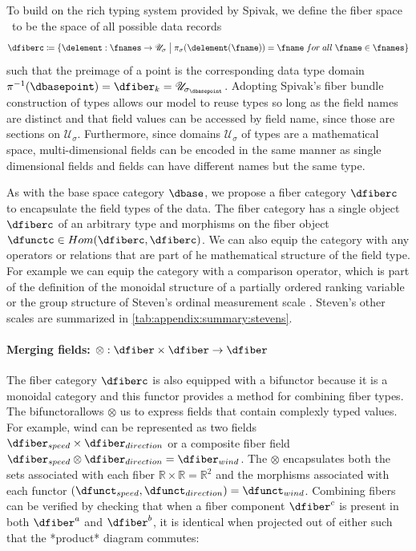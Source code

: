 \documentclass[journal]{IEEEtran}
\theoremstyle{definition}
\theoremstyle{remark}
\begin{document}
To build on the rich typing system provided by Spivak, we define the \textcolor{fiber}{fiber space} \dfiberc\ to be the space of all possible data records
\begin{equation}
  \dfiberc \coloneqq \{\delement: \fnames \rightarrow \mathscr{U}_{\sigma} \bigm{\vert} \pi_{\sigma}(\delement(\fname)) = \fname\;for\;all\; \fname \in \fnames \}
\end{equation}
such that the preimage of a point is the corresponding data type domain $\pi^{-1}(\dbasepoint) = \dfiber_{k} = \mathscr{U}_{{\sigma}_{\dbasepoint}}$. 
Adopting Spivak's fiber bundle construction of types allows our model to reuse types so long as the field names are distinct and that field values can be accessed by field name,  since those are sections on $\mathcal{U}_{\sigma}$. Furthermore, since domains $\mathscr{U}_{{\sigma}}$ of types are a mathematical space, multi-dimensional fields can be encoded in the same manner as single dimensional fields and fields can have different names but the same type. 

As with the base space category $\mathcal{\dbase}$, we propose a fiber category $\mathcal{\dfiberc}$ to encapsulate the field types of the data. The fiber category has a single object $\dfiberc$ of an arbitrary type and morphisms on the fiber object $\dfunctc \in Hom(\dfiberc, \dfiberc)$. We can also equip the category with any operators or relations that are part of he mathematical structure of the field type. For example we can equip the category with a comparison operator, which is part of the definition of the monoidal structure of a partially ordered ranking variable \cite{bruggemannRankingPrioritizationMultiindicator2011} or the group structure of Steven's ordinal measurement scale \cite{stevensTheoryScalesMeasurement1946, leaFormalizationMeasurementScale1971, thomasMathematizationNotMeasurement2014}. Steven's other scales are summarized in \autoref{tab:appendix:summary:stevens}. 

\paragraph{Merging fields: $\otimes: \mathcal{\dfiber} \times \mathcal{\dfiber} \rightarrow \mathcal{\dfiber}$ }

The fiber category $\mathcal{\dfiberc}$ is also equipped with a bifunctor because it is a monoidal category and this functor provides a method for combining fiber types. The bifunctorallows $\otimes$ us to express fields that contain complexly typed values. For example, wind can be represented as two fields $\dfiber_{speed} \times \dfiber_{direction}$ or a composite fiber field $\dfiber_{speed} \otimes \dfiber_{direction} = \dfiber_{wind}$. The $\otimes$ encapsulates both the sets associated with each fiber $\mathbb{R} \times \mathbb{R} = \mathbb{R}^{2}$ and the morphisms associated with each functor $(\dfunct_{speed}, \dfunct_{direction}) = \dfunct_{wind}$. Combining fibers can be verified by checking that when a fiber component $\dfiber^{c}$ is present in both $\dfiber^{a}$ and $\dfiber^{b}$, it is identical when projected out of either such that the *product* diagram commutes:
\end{document}
